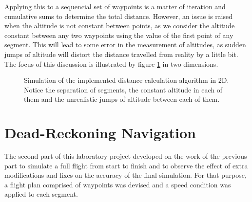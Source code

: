 \documentclass{article}
\begin{document}
Applying this to a sequencial set of waypoints is a matter of iteration and cumulative sums to determine the total distance. However, an issue is raised when the altitude is not constant between points, as we consider the altitude constant between any two waypoints using the value of the first point of any segment. This will lead to some error in the measurement of altitudes, as sudden jumps of altitude will distort the distance travelled from reality by a little bit. The focus of this discussion is illustrated by figure \ref{tikz:consth_error} in two dimensions.
\begin{figure}[ht]
    \centering
    \caption{Simulation of the implemented distance calculation algorithm in 2D. Notice the separation of segments, the constant altitude in each of them and the unrealistic jumps of altitude between each of them.}
    \label{tikz:consth_error}
\end{figure}

\part{Dead-Reckoning Navigation}

The second part of this laboratory project developed on the work of the previous part to simulate a full flight from start to finish and to observe the effect of extra modifications and fixes on the accuracy of the final simulation. For that purpose, a flight plan comprised of waypoints was devised and a speed condition was applied to each segment.
\end{document}
